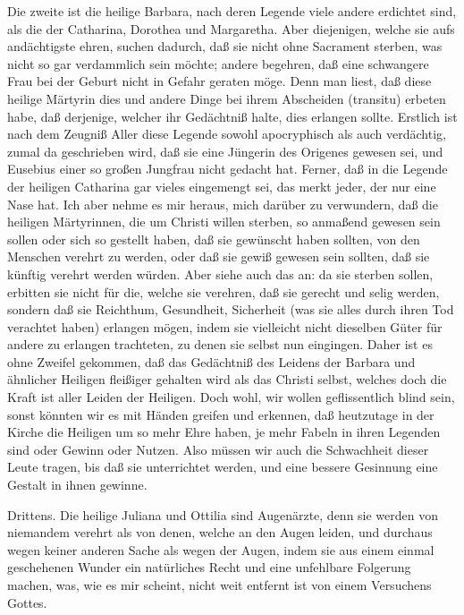 Die zweite ist die heilige Barbara, nach deren Legende viele andere erdichtet sind, als die der Catharina, Dorothea und Margaretha. Aber diejenigen, welche sie aufs andächtigste ehren, suchen dadurch, daß sie nicht ohne Sacrament sterben, was nicht so gar verdammlich sein möchte; andere begehren, daß eine schwangere Frau bei der Geburt nicht in Gefahr geraten möge. Denn man liest, daß diese heilige Märtyrin dies und andere Dinge bei ihrem Abscheiden (transitu) erbeten habe, daß derjenige, welcher ihr Gedächtniß halte, dies erlangen sollte. Erstlich ist nach dem Zeugniß Aller diese Legende sowohl apocryphisch als auch verdächtig, zumal da geschrieben wird, daß sie eine Jüngerin des Origenes gewesen sei, und Eusebius einer so großen Jungfrau nicht gedacht hat. Ferner, daß in die Legende der heiligen Catharina gar vieles eingemengt sei, das merkt jeder, der nur eine Nase hat. Ich aber nehme es mir heraus, mich darüber zu verwundern, daß die heiligen Märtyrinnen, die um Christi willen sterben, so anmaßend gewesen sein sollen oder sich so gestellt haben, daß sie gewünscht haben sollten, von den Menschen verehrt zu werden, oder daß sie gewiß gewesen sein sollten, daß sie künftig verehrt werden würden. Aber siehe auch das an: da sie sterben sollen, erbitten sie nicht für die, welche sie verehren, daß sie gerecht und selig werden, sondern daß sie Reichthum, Gesundheit, Sicherheit (was sie alles durch ihren Tod verachtet haben) erlangen mögen, indem sie vielleicht nicht dieselben Güter für andere zu erlangen trachteten, zu denen sie selbst nun eingingen. Daher ist es ohne Zweifel gekommen, daß das Gedächtniß des Leidens der Barbara und ähnlicher Heiligen fleißiger gehalten wird als das Christi selbst, welches doch die Kraft ist aller Leiden der Heiligen. Doch wohl, wir wollen geflissentlich blind sein, sonst könnten wir es mit Händen greifen und erkennen, daß heutzutage in der Kirche die Heiligen um so mehr Ehre haben, je mehr Fabeln in ihren Legenden sind oder Gewinn oder Nutzen. Also müssen wir auch die Schwachheit dieser Leute tragen, bis daß sie unterrichtet werden, und eine bessere Gesinnung eine Gestalt in ihnen gewinne.

Drittens. Die heilige Juliana und Ottilia sind Augenärzte, denn sie werden von niemandem verehrt als von denen, welche an den Augen leiden, und durchaus wegen keiner anderen Sache als wegen der Augen, indem sie aus einem einmal geschehenen Wunder ein natürliches Recht und eine unfehlbare Folgerung machen, was, wie es mir scheint, nicht weit entfernt ist von einem Versuchens Gottes.

